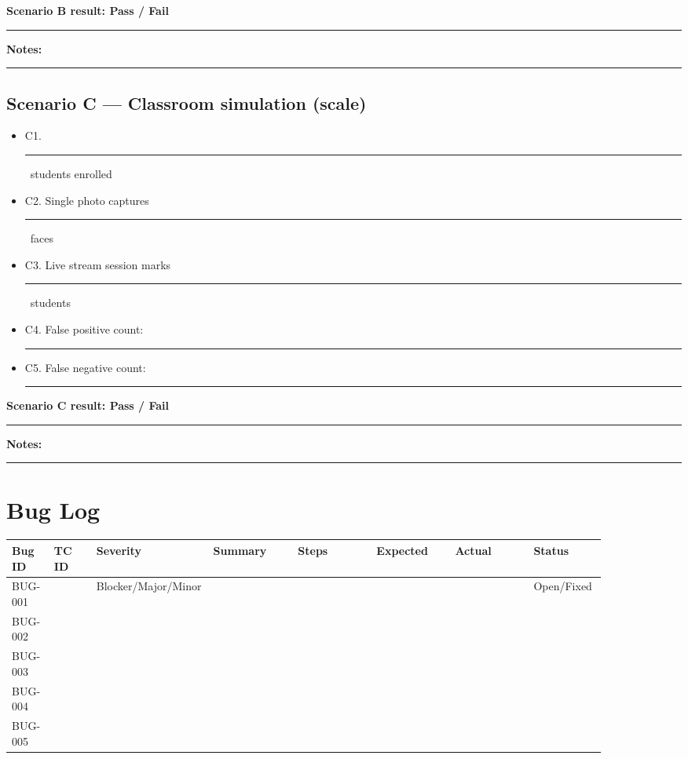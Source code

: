 \documentclass[11pt,a4paper,oneside]{article}
\newcommand{\chk}{\fbox{\rule{0pt}{1.05ex}\rule{1.05ex}{0pt}}}
\newcommand{\fillin}[1][3.5cm]{\rule{#1}{0.4pt}}
\newcommand{\fillinlong}{\rule{0.72\textwidth}{0.4pt}}
\newcommand{\notesblock}{\par\smallskip\noindent\textbf{Notes:}\ \fillinlong\par\smallskip}
\newcommand{\fieldline}[1]{\par\smallskip\noindent\textbf{#1}\ \fillin\par}
\begin{document}
\fieldline{Scenario B result: Pass / Fail}
\notesblock

\subsection{Scenario C — Classroom simulation (scale)}

\begin{itemize}[leftmargin=2em, itemsep=0.25em]
  \item[\chk] C1. \fillin[1.5cm]\ students enrolled
  \item[\chk] C2. Single photo captures \fillin[1.5cm]\ faces
  \item[\chk] C3. Live stream session marks \fillin[1.5cm]\ students
  \item[\chk] C4. False positive count: \fillin[1.5cm]
  \item[\chk] C5. False negative count: \fillin[1.5cm]
\end{itemize}

\fieldline{Scenario C result: Pass / Fail}
\notesblock

\section{Bug Log}

\footnotesize
\begin{tabular}{@{}>{\raggedright\arraybackslash}p{0.07\linewidth} >{\raggedright\arraybackslash}p{0.07\linewidth} >{\raggedright\arraybackslash}p{0.09\linewidth} >{\raggedright\arraybackslash}p{0.14\linewidth} >{\raggedright\arraybackslash}p{0.13\linewidth} >{\raggedright\arraybackslash}p{0.13\linewidth} >{\raggedright\arraybackslash}p{0.13\linewidth} >{\raggedright\arraybackslash}p{0.12\linewidth}@{}}
  \toprule
  \textbf{Bug ID} & \textbf{TC ID} & \textbf{Severity} & \textbf{Summary} & \textbf{Steps} & \textbf{Expected} & \textbf{Actual} & \textbf{Status} \\
  \midrule
  BUG-001 & & Blocker/Major/Minor & & & & & Open/Fixed \\
  BUG-002 & & & & & & & \\
  BUG-003 & & & & & & & \\
  BUG-004 & & & & & & & \\
  BUG-005 & & & & & & & \\
  \bottomrule
\end{tabular}
\normalsize
\end{document}

